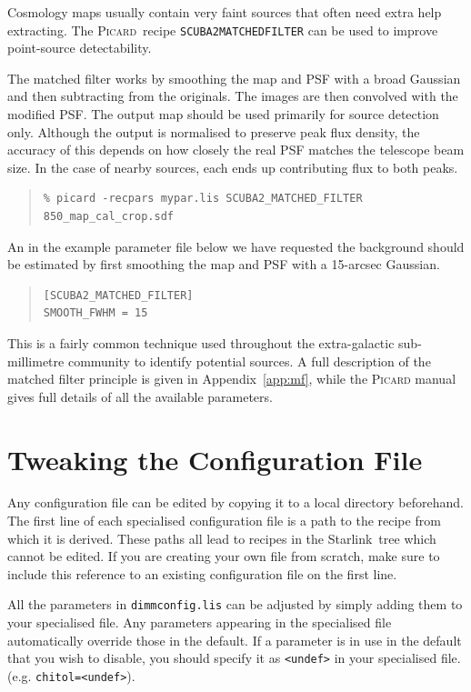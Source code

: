 \documentclass[twoside,11pt]{article}
\newcommand{\htmladdnormallink}[2]{#1}
\newcommand{\xref}[3]{#1}
\newcommand{\xlabel}[1]{}
\renewcommand{\_}{\texttt{\symbol{95}}}
\newenvironment{myquote}{\begin{quote}\begin{small}}{\end{small}\end{quote}}
\newcommand{\starlink}{\htmladdnormallink{Starlink}{http://starlink.jach.hawaii.edu}}
\newcommand{\picard}{\xref{\textsc{Picard}}{sun265}{}}
\begin{document}
Cosmology maps usually contain very faint sources that often need
extra help extracting. The \picard\ recipe
\texttt{SCUBA2\_MATCHED\_FILTER} can be used to improve point-source
detectability.

The matched filter works by smoothing the map and PSF with a broad
Gaussian and then subtracting from the originals. The images are then
convolved with the modified PSF.  The output map should be used
primarily for source detection only. Although the output is normalised
to preserve peak flux density, the accuracy of this depends on how
closely the real PSF matches the telescope beam size. In the case of
nearby sources, each ends up contributing flux to both peaks.

 \begin{myquote}
\begin{verbatim}
% picard -recpars mypar.lis SCUBA2_MATCHED_FILTER 850_map_cal_crop.sdf
\end{verbatim}
\end{myquote}

An in the example parameter file below we have requested the
background should be estimated by first smoothing the map and PSF with
a 15-arcsec Gaussian.
\begin{myquote}
\begin{verbatim}
[SCUBA2_MATCHED_FILTER]
SMOOTH_FWHM = 15
\end{verbatim}
\end{myquote}
This is a fairly common technique used throughout the extra-galactic
sub-millimetre community to identify potential sources. A full
description of the matched filter principle is given in
Appendix~\ref{app:mf}, while the \textsc{Picard} manual gives full details
of all the available parameters.

\clearpage
\section{\xlabel{tweak}Tweaking the Configuration File}
\label{sec:tweak}

Any configuration file can be edited by copying it to a local
directory beforehand. The first line of each specialised configuration
file is a path to the recipe from which it is derived. These paths all
lead to recipes in the \starlink\ tree which cannot be edited. If you
are creating your own file from scratch, make sure to include this
reference to an existing configuration file on the first line.

All the parameters in \texttt{dimmconfig.lis} can be adjusted by
simply adding them to your specialised file. Any parameters appearing
in the specialised file automatically override those in the default.
If a parameter is in use in the default that you wish to disable, you
should specify it as \texttt{<undef>} in your specialised file. (e.g.
\texttt{chitol=<undef>}).
\end{document}
